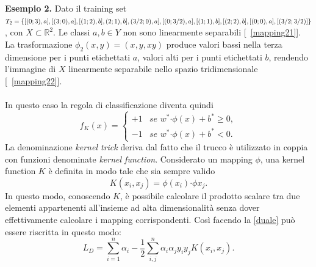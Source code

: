 \documentclass [11pt,a4paper,twoside,openright] {book}
\begin{document}
\textbf{Esempio 2.} Dato il training set $T_2=\lbrace [(0;3),a], [(3;0),a], [(1;2),b], (2;1),b], \linebreak (3/2;0),a], [(0;3/2),a], [(1;1),b], [(2;2),b], [(0;0),a], [(3/2; 3/2)] \rbrace$, con $X \subset \mathbb{R}^2$. Le classi $a, b \in Y$ non sono linearmente separabili [\figurename~\ref{mapping21}]. La trasformazione $\phi_2(x,y)=(x,y,xy)$ produce valori bassi nella terza dimensione per i punti etichettati $a$, valori alti per i punti etichettati $b$, rendendo l'immagine di $X$ linearmente separabile nello spazio tridimensionale [\figurename~\ref{mapping22}].\\\\
In questo caso la regola di classificazione diventa quindi
\begin{equation}
f_K(x)=
\begin{cases}
+1 & \textit{se } w^* \boldsymbol{\cdot} \phi(x) + b^* \geq 0, \\
-1 & \textit{se } w^* \boldsymbol{\cdot} \phi(x)  + b^*< 0.
\end{cases}
\end{equation}
La denominazione \textit{kernel trick} deriva dal fatto che il trucco è utilizzato in coppia con funzioni denominate \textit{kernel function}\cite{shawe2004kernel}. Considerato un mapping $\phi$, una kernel function $K$ è definita in modo tale che sia sempre valido
\begin{equation}
K(x_i,x_j) = \phi(x_i) \boldsymbol{\cdot} \phi{x_j}.
\end{equation}
In questo modo, conoscendo $K$, è possibile calcolare il prodotto scalare tra due elementi appartenenti all'insieme ad alta dimensionalità senza dover effettivamente calcolare i mapping corrispondenti. Così facendo la \ref{duale} può essere riscritta in questo modo:
\begin{equation}
L_D = \sum_{i=1}^n \alpha_i -\dfrac{1}{2} \sum_{i,j}^n \alpha_i \alpha_j y_i y_j K(x_i,x_j).
\end{equation}
\end{document}
